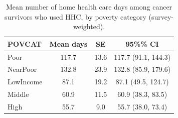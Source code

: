 
\begin{longtable}[t]{lccc}
\caption{\label{tab:tab:days-povcat}Mean number of home health care days among cancer survivors who used HHC, by poverty category (survey-weighted).}\\
\toprule
POVCAT & Mean days & SE & 95\%\% CI\\
\midrule
Poor & 117.7 & 13.6 & 117.7 (91.1, 144.3)\\
NearPoor & 132.8 & 23.9 & 132.8 (85.9, 179.6)\\
LowIncome & 87.1 & 19.2 & 87.1 (49.5, 124.7)\\
Middle & 60.9 & 11.5 & 60.9 (38.3, 83.5)\\
High & 55.7 & 9.0 & 55.7 (38.0, 73.4)\\
\bottomrule
\end{longtable}

